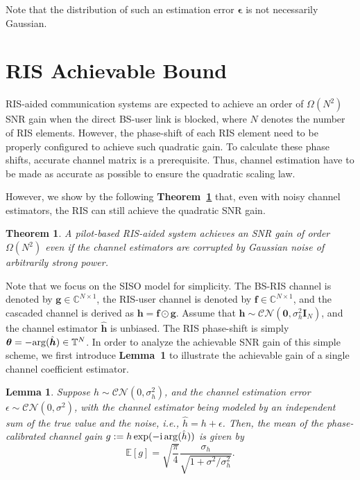 \documentclass[a4paper,12pt]{article}
\newtheorem{theorem}{\bf Theorem}
\newtheorem{lemma}{\bf Lemma}
\def \ri {{\rm i}}
\begin{document}
Note that the distribution of such an estimation error ${\bm \epsilon}$ is not necessarily Gaussian. 



\section{RIS Achievable Bound}
RIS-aided communication systems are expected to achieve an order of $\Omega(N^2)$ SNR gain when the direct BS-user link is blocked, where $N$ denotes the number of RIS elements. However, the phase-shift of each RIS element need to be properly configured to achieve such quadratic gain. To calculate these phase shifts, accurate channel matrix is a prerequisite. Thus, channel estimation have to be made as accurate as possible to ensure the quadratic scaling law. 

However, we show by the following {\bf Theorem~\ref{thm1}} that, even with noisy channel estimators, the RIS can still achieve the quadratic SNR gain. 
\begin{theorem} \label{thm1}
    A pilot-based RIS-aided system achieves an SNR gain of order $\Omega(N^2)$ even if the channel estimators are corrupted by Gaussian noise of arbitrarily strong power. 
\end{theorem}

Note that we focus on the SISO model for simplicity. The BS-RIS channel is denoted by ${\bm g}\in\mathbb{C}^{N\times 1}$, the RIS-user channel is denoted by ${\bm f}\in\mathbb{C}^{N\times 1}$, and the cascaded channel is derived as ${\bm h} = {\bm f}\odot {\bm g}$. Assume that ${\bm h}\sim {\mathcal{CN}}({\bm 0},\sigma_h^2 {\bm I}_N)$, and the channel estimator $\hat{\bm h}$ is unbiased. The RIS phase-shift is simply ${\bm \theta} = -{\rm arg}(\hat{\bm h})\in {\mathbb{T}}^N$. In order to analyze the achievable SNR gain of this simple scheme, we first introduce {\bf Lemma~1} to illustrate the achievable gain of a single channel coefficient estimator. 

\begin{lemma}
    Suppose $h\sim \mathcal{CN}(0,\sigma_h^2)$, and the channel estimation error $\epsilon\sim \mathcal{CN}(0,\sigma^2)$, with the channel estimator being modeled by an independent sum of the true value and the noise, i.e., $\hat{h} = h+\epsilon$. 
    Then, the mean of the phase-calibrated channel gain $g:=h\exp(-\ri\,{\rm arg}(\hat{h}) )$ is given by  
    \begin{equation}
        \mathbb{E}\left[ g \right] = \sqrt{\frac{\pi}{4}}\frac{\sigma_h}{\sqrt{1+\sigma^2/\sigma_h^2}}.
    \end{equation}
\end{lemma}
\end{document}
